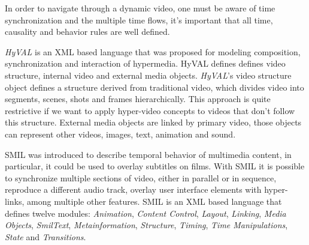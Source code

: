   In order to navigate through a dynamic video, one must be aware of time synchronization and the multiple time flows, it's important that all time, causality and behavior rules are well defined.
  
  \emph{HyVAL}\cite{hyval} is an \ac{XML} based language that was proposed for modeling composition, synchronization and interaction of hypermedia. HyVAL defines defines video structure, internal video and external media objects. 
  \emph{HyVAL}'s video structure object defines a structure derived from traditional video, which divides video into segments, scenes, shots and frames hierarchically.
  This approach is quite restrictive if we want to apply hyper-video concepts to videos that don't follow this structure. External media objects are linked by primary video, those objects can represent other videos, images, text, animation and sound.

  \ac{SMIL}\cite{smil} was introduced to describe temporal behavior of multimedia content, in particular, it could be used to overlay subtitles on films. With \ac{SMIL} it is possible to synchronize multiple sections of video, either in parallel or in sequence, reproduce a different audio track, overlay user interface elements with hyper-links, among multiple other features.
  \ac{SMIL} is an \ac{XML} based language that defines twelve modules: \emph{Animation}, \emph{Content Control}, \emph{Layout}, \emph{Linking}, \emph{Media Objects}, \emph{SmilText}, \emph{Metainformation}, \emph{Structure}, \emph{Timing}, \emph{Time Manipulations}, \emph{State} and \emph{Transitions}.


